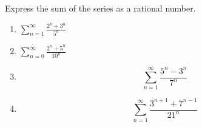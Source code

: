 Express the sum of the series as a rational number.
\begin{multicols}{2}
\begin{enumerate}[ref={\fcProblemRef}]
\item 
\label{problemSum(2^n+3^n)/(5^n)}
$
\displaystyle \sum\limits_{n=1}^{\infty} \frac{2^n+3^n}{5^n}
$


\item \label{problemsumn=0^infty(2^n+5^n)/10^n}
$\displaystyle\sum_{n=0}^{\infty} \frac{2^n+5^n}{10^n}$

\item \label{problemSum(3^n+5^n)/(7^n)}
\[
\sum\limits_{n=1}^{\infty} \frac{5^n-3^n}{7^n}
\]

\item \label{sum_n=1^infty(3^(n+1)+7^(n-1))/21^n}
\[
\sum_{n=1}^\infty \frac{3^{n+1}+7^{n-1}}{21^n}
\]


\end{enumerate}
\end{multicols}